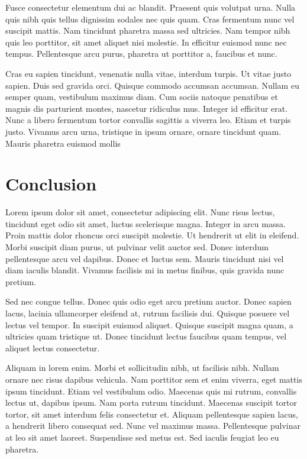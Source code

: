\documentclass{report}
\begin{document}
            Fusce consectetur elementum dui ac blandit. Praesent quis volutpat urna. Nulla quis nibh quis tellus dignissim sodales nec quis quam. Cras fermentum nunc vel suscipit mattis. Nam tincidunt pharetra massa sed ultricies. Nam tempor nibh quis leo porttitor, sit amet aliquet nisi molestie. In efficitur euismod nunc nec tempus. Pellentesque arcu purus, pharetra ut porttitor a, faucibus et nunc.

            Cras eu sapien tincidunt, venenatis nulla vitae, interdum turpis. Ut vitae justo sapien. Duis sed gravida orci. Quisque commodo accumsan accumsan. Nullam eu semper quam, vestibulum maximus diam. Cum sociis natoque penatibus et magnis dis parturient montes, nascetur ridiculus mus. Integer id efficitur erat. Nunc a libero fermentum tortor convallis sagittis a viverra leo. Etiam et turpis justo. Vivamus arcu urna, tristique in ipsum ornare, ornare tincidunt quam. Mauris pharetra euismod mollis


    \makeatletter
    \def\toclevel@chapter{-1}
    \makeatother

    \chapter{Conclusion}
        Lorem ipsum dolor sit amet, consectetur adipiscing elit. Nunc risus lectus, tincidunt eget odio sit amet, luctus scelerisque magna. Integer in arcu massa. Proin mattis dolor rhoncus orci suscipit molestie. Ut hendrerit ut elit in eleifend. Morbi suscipit diam purus, ut pulvinar velit auctor sed. Donec interdum pellentesque arcu vel dapibus. Donec et luctus sem. Mauris tincidunt nisi vel diam iaculis blandit. Vivamus facilisis mi in metus finibus, quis gravida nunc pretium.

        Sed nec congue tellus. Donec quis odio eget arcu pretium auctor. Donec sapien lacus, lacinia ullamcorper eleifend at, rutrum facilisis dui. Quisque posuere vel lectus vel tempor. In suscipit euismod aliquet. Quisque suscipit magna quam, a ultricies quam tristique ut. Donec tincidunt lectus faucibus quam tempus, vel aliquet lectus consectetur.

        Aliquam in lorem enim. Morbi et sollicitudin nibh, ut facilisis nibh. Nullam ornare nec risus dapibus vehicula. Nam porttitor sem et enim viverra, eget mattis ipsum tincidunt. Etiam vel vestibulum odio. Maecenas quis mi rutrum, convallis lectus ut, dapibus ipsum. Nam porta rutrum tincidunt. Maecenas suscipit tortor tortor, sit amet interdum felis consectetur et. Aliquam pellentesque sapien lacus, a hendrerit libero consequat sed. Nunc vel maximus massa. Pellentesque pulvinar at leo sit amet laoreet. Suspendisse sed metus est. Sed iaculis feugiat leo eu pharetra.
\end{document}
